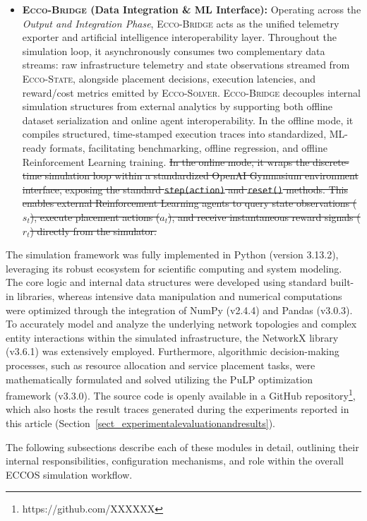 \documentclass[ASNA]{USG} %
\begin{document}
\begin{itemize}
    \item \textbf{\textsc{Ecco-Bridge} (Data Integration \& ML Interface):}
    Operating across the \emph{Output and Integration Phase}, \textsc{Ecco-Bridge} acts as the unified telemetry exporter and artificial intelligence interoperability layer. Throughout the simulation loop, it asynchronously consumes two complementary data streams: raw infrastructure telemetry and state observations streamed from \textsc{Ecco-State}, alongside placement decisions, execution latencies, and reward/cost metrics emitted by \textsc{Ecco-Solver}. \textsc{Ecco-Bridge} decouples internal simulation structures from external analytics by supporting both offline dataset serialization and online agent interoperability. In the offline mode, it compiles structured, time-stamped execution traces into standardized, ML-ready formats, facilitating benchmarking, offline regression, and offline Reinforcement Learning training. \sout{In the online mode, it wraps the discrete-time simulation loop within a standardized OpenAI Gymnasium environment interface, exposing the standard \texttt{step(action)} and \texttt{reset()} methods. This enables external Reinforcement Learning agents to query state observations ($s_t$), execute placement actions ($a_t$), and receive instantaneous reward signals ($r_t$) directly from the simulator.}

\end{itemize}

The simulation framework was fully implemented in Python (version 3.13.2), leveraging its robust ecosystem for scientific computing and system modeling. The core logic and internal data structures were developed using standard built-in libraries, whereas intensive data manipulation and numerical computations were optimized through the integration of NumPy (v2.4.4) and Pandas (v3.0.3). To accurately model and analyze the underlying network topologies and complex entity interactions within the simulated infrastructure, the NetworkX library (v3.6.1) was extensively employed. Furthermore, algorithmic decision-making processes, such as resource allocation and service placement tasks, were mathematically formulated and solved utilizing the PuLP optimization framework (v3.3.0). The source code is openly available in a GitHub repository\footnote{\color{red}https://github.com/XXXXXX\color{black}}, which also hosts the result traces generated during the experiments reported in this article (Section~\ref{sect_experimentalevaluationandresults}).

The following subsections describe each of these modules in detail, outlining their internal responsibilities, configuration mechanisms, and role within the overall \textsc{ECCOS} simulation workflow.
\end{document}

